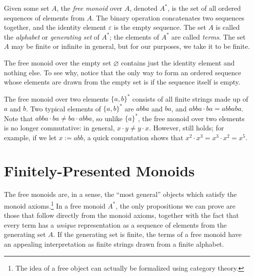 \documentclass[../generics]{subfiles}
\begin{document}
\begin{definition}
%
%
%
%
Given some set $A$, the \emph{free monoid} over $A$, denoted $A^*$, is the set of all ordered sequences of elements from $A$. The binary operation concatenates two sequences together, and the identity element $\varepsilon$ is the empty sequence. The set $A$ is called the \emph{alphabet} or \emph{generating set} of $A^*$; the elements of $A^*$ are called \emph{terms}. The set $A$ may be finite or infinite in general, but for our purposes, we take it to be finite.
\end{definition}
\begin{example}
%
%
%
The free monoid over the empty set $\varnothing$ contains just the identity element and nothing else. To see why, notice that the only way to form an ordered sequence whose elements are drawn from the empty set is if the sequence itself is empty.
\end{example}
\begin{example}
%
The free monoid over two elements $\{a,b\}^*$ consists of all finite strings made up of $a$ and $b$. Two typical elements of $\{a,b\}^*$ are $abba$ and $ba$, and $abba\cdot ba=abbaba$. Note that $abba\cdot ba\neq ba\cdot abba$, so unlike $\{a\}^*$, the free monoid over two elements is no longer commutative: in general, $x\cdot y \neq y \cdot x$. However,  still holds; for example, if we let $x:=abb$, a quick computation shows that $x^2\cdot x^3=x^3\cdot x^2=x^5$.
\end{example}

\section{Finitely-Presented Monoids}\label{finitely presented monoids}

The free monoids are, in a sense, the ``most general'' objects which satisfy the monoid axioms.\footnote{The idea of a free object can actually be formalized using category theory.} In a free monoid $A^*$, the only propositions we can prove are those that follow directly from the monoid axioms, together with the fact that every term has a \emph{unique} representation as a sequence of elements from the generating set $A$. If the generating set is finite, the terms of a free monoid have an appealing interpretation as finite strings drawn from a finite alphabet.
\end{document}
